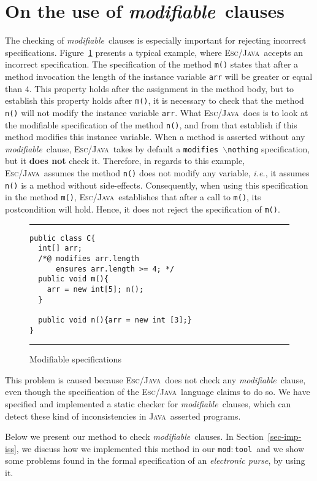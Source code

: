 \documentclass[a4paper]{llncs}
\newcommand{\escj}{\textsc{Esc/Java}}
\newcommand{\java}{\textsc{Java}}
\newcommand{\modtool}{\texttt{mod$:$tool}}
\newcommand{\modif}{\textit{modifiable}}
\begin{document}
\section{On the use of \modif~clauses}
\label{sec-sem-mod-cla}
The checking of \modif~clauses is especially important for rejecting
incorrect specifications. Figure~\ref{fig-mod-spe} presents
a typical example, where \escj~accepts an incorrect specification. The
specification of the method
\texttt{m()} states that after a method invocation the length of the
instance variable \texttt{arr} will be greater or equal than $4$. This
property holds after the assignment in the
method body, but to establish this property holds after \texttt{m()},
it is necessary to check that the method \texttt{n()} will not modify the
instance variable \texttt{arr}. What \escj~does is to look at the
modifiable specification of the method \texttt{n()}, and from that
establish
if this method modifies this instance variable. When a method is
asserted without any \modif~clause, \escj~takes by default a
\texttt{modifies $\backslash$nothing} specification, but it {\bf does
not} check it. Therefore, in regards to this example, \escj~assumes
the method \texttt{n()} does not modify any variable, \emph{i.e.}, it
assumes \texttt{n()} is a method without side-effects. Consequently,
when using this specification in the method \texttt{m()},
\escj~establishes that after a call to \texttt{m()}, its
postcondition will hold. Hence, it does not reject the specification of
\texttt{m()}.
\begin{figure}[tbh]
\rule{\linewidth}{0.25mm}
\begin{verbatim}
public class C{
  int[] arr;
  /*@ modifies arr.length
      ensures arr.length >= 4; */
  public void m(){
    arr = new int[5]; n();
  }

  public void n(){arr = new int [3];}
}
\end{verbatim}
\caption{Modifiable specifications} 
\label{fig-mod-spe} 
\rule{\linewidth}{0.25mm} 
\end{figure} 
This problem is caused because \escj~does not check any \modif~clause,
even though the specification of the \escj~language claims to do so. We
have specified and implemented a static checker for \modif~clauses,
which can detect these kind of inconsistencies in \java~asserted
programs. 

Below we present our method to check \modif~clauses. In
Section~\ref{sec-imp-iss}, we discuss how we implemented this method
in our \modtool~and we show
some problems found in the formal specification of an
\emph{electronic purse}, by using it.
\end{document}
